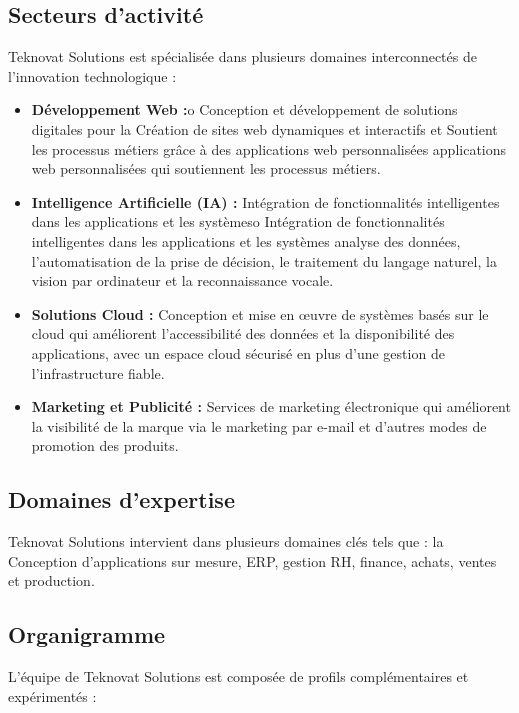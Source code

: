 \subsection{Secteurs d'activité}

Teknovat Solutions est spécialisée dans plusieurs domaines interconnectés de
l'innovation technologique :

\begin{itemize}[leftmargin=*, noitemsep]
    \item \textbf{Développement Web :}o	Conception et développement de solutions digitales pour la 
   Création de sites web dynamiques et interactifs et Soutient les processus métiers grâce à des applications web personnalisées
   applications web personnalisées qui soutiennent les processus métiers.

    \item \textbf{Intelligence Artificielle (IA) :} Intégration de fonctionnalités intelligentes dans les applications et les systèmeso	Intégration de fonctionnalités intelligentes dans les applications et les systèmes
    analyse des données,
    l'automatisation de la prise de décision, le traitement du langage naturel,
    la vision par ordinateur et la reconnaissance vocale.

    \item \textbf{Solutions Cloud :} Conception et mise en œuvre de systèmes basés
    sur le cloud qui améliorent l'accessibilité des données et la disponibilité des
    applications, avec un espace cloud sécurisé en plus d'une gestion de l'infrastructure
    fiable.

    \item \textbf{Marketing et Publicité :} Services de marketing électronique
    qui améliorent la visibilité de la marque via le marketing par
    e-mail et d'autres modes de promotion des produits.
\end{itemize}

\subsection{Domaines d'expertise}
Teknovat Solutions intervient dans plusieurs domaines clés tels que :
la Conception d'applications sur mesure, ERP, gestion RH, finance, achats, ventes et production.
\subsection{Organigramme}
L'équipe de Teknovat Solutions est composée de profils complémentaires et expérimentés :

